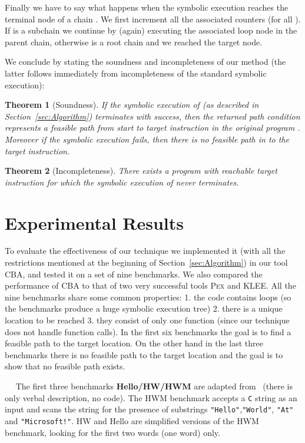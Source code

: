 \documentclass{llncs}
\newtheorem{thm}{Theorem}
\newcommand{\Pex}{\textsc{Pex}\xspace}
\newcommand{\Klee}{\textsc{KLEE}\xspace}
\newcommand{\CBATool}{\textsc{CBA}\xspace}
\renewcommand{\paragraph}[1]{\vspace{0.2cm}\noindent{\bf #1}~~}
\begin{document}
Finally we have to say what happens when the symbolic execution reaches the
terminal node of a chain . We first increment all the associated
counters  (for all ). If  is a subchain we continue by
(again) executing the associated loop node in the parent chain, otherwise  is a root
chain and we reached the target node.

We conclude by stating the soundness and incompleteness of our method (the
latter follows immediately from incompleteness of the standard symbolic execution):

\begin{thm}[Soundness]
  If the symbolic execution of  (as described in
  Section~\ref{sec:Algorithm}) terminates with success,
  then the returned path  condition represents a feasible path from start to target
  instruction in the original program . Moreover if the symbolic
  execution fails, then there is no feasible path in  to the target instruction.
\end{thm}

\begin{thm}[Incompleteness]
  There exists a program  with
reachable target instruction for which the symbolic execution of  never terminates.
\end{thm}


\section{Experimental Results}
\label{sec:Results}

To evaluate the effectiveness of our technique we implemented it (with all
the restrictions mentioned at the beginning of Section~\ref{sec:Algorithm}) in our tool
\CBATool, and tested it on a set of nine benchmarks. We  also compared the
performance of \CBATool to that of two very successful tools \Pex\cite{TdH08,Pex}
and \Klee\cite{CDE08}. All the nine benchmarks share some common
properties: 1. the code contains loops (so the benchmarks produce a huge symbolic execution
tree) 2. there is a unique location to be reached
3. they consist of only one function (since
our technique does not handle function calls). In the  first six
benchmarks the goal is to find a feasible path to the target location.
On the other hand in the last three benchmarks there is no
feasible path to the target location and the goal is to show that no
feasible path exists.

\paragraph{Benchmark Description}
The first three benchmarks \textbf{Hello/HW/HWM} are adapted from \cite{AGT08}~(there is only
verbal description, no code). The HWM benchmark accepts a \texttt{C} string
as an input and scans the string for the presence of substrings
\texttt{"Hello"},\texttt{"World"}, \texttt{"At"} and \texttt{"Microsoft!"}.
HW and Hello are simplified versions of the HWM benchmark, looking for the
first two words (one word) only. 
\end{document}
